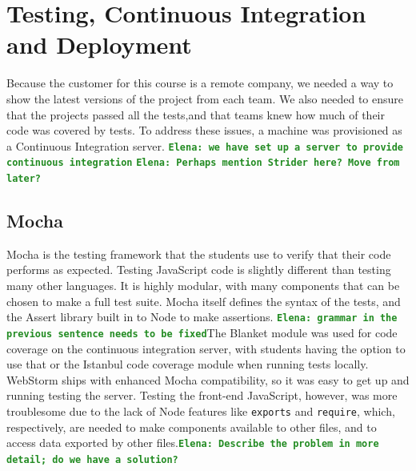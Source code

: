 \documentclass[12pt]{article}
\newcommand{\comment}[1]{{\bf \tt  {#1}}}
\newcommand{\emcomment}[1]{\textcolor{ForestGreen}{\comment{Elena: {#1}}}}
\newcommand{\code}[1]{{\texttt {#1}}}
\begin{document}

\section{Testing, Continuous Integration and Deployment}\label{sec:CI}
Because the customer for this course is a remote company, we needed a way to show the latest versions of the project from each team. We also needed to ensure that the projects passed all the tests,and that teams knew how much of their code was covered by tests. To address these issues, a machine was provisioned as a Continuous Integration server. \emcomment{we have set up a server to provide continuous integration} \emcomment{Perhaps mention Strider here? Move from later?}

\subsection{Mocha}\label{sec:mocha}
Mocha is the testing framework that the students use to verify that their code performs as expected. Testing JavaScript code is slightly different than testing many other languages. It is highly modular, with many components that can be chosen to make a full test suite. Mocha itself defines the syntax of the tests, and the Assert library built in to Node to make assertions. \emcomment{grammar in the previous sentence needs to be fixed}The Blanket module was used for code coverage on the continuous integration server, with students having the option to use that or the Istanbul code coverage module when running tests locally. WebStorm ships with enhanced Mocha compatibility, so it was easy to get up and running testing the server. Testing the front-end JavaScript, however, was more troublesome due to the lack of Node features like \code{exports} and \code{require}, which, respectively, are needed to make components available to other files, and to access data exported by other files.\emcomment{Describe the problem in more detail; do we have a solution?}
\end{document}
